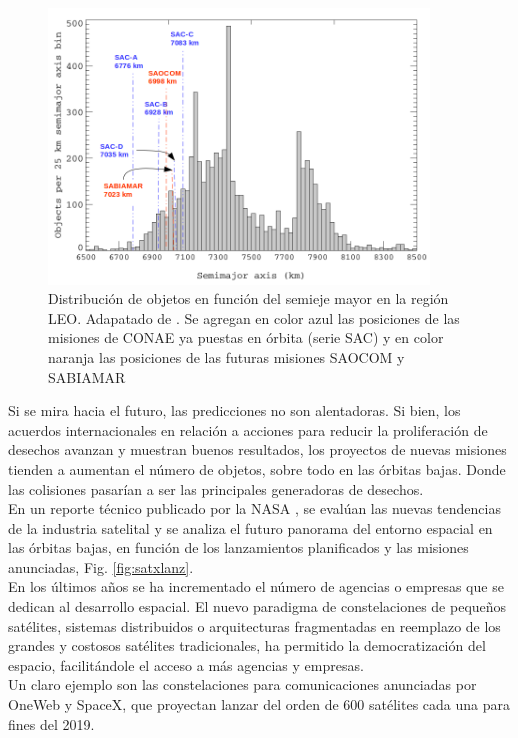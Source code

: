 \begin{figure}[!h]
  \centering
  \includegraphics[width=0.9\textwidth]{imagenes/SDvsaltura2011CONAE}
  \caption[Distribuci\'on de objetos en funci\'on del semieje mayor.]{Distribuci\'on de objetos en funci\'on del semieje mayor en la regi\'on LEO. Adapatado de \citep{Klinkrad}. Se agregan en color azul las posiciones de las misiones de CONAE ya puestas en \'orbita (serie SAC) y en color naranja las posiciones de las futuras misiones SAOCOM y SABIAMAR}
  \label{fig:Dvsaltura}
\end{figure}

Si se mira hacia el futuro, las predicciones no son alentadoras. Si bien, los acuerdos internacionales en relaci\'on a acciones para reducir la proliferaci\'on de desechos avanzan y muestran buenos resultados, los proyectos de nuevas misiones tienden a aumentan el n\'umero de objetos, sobre todo en las \'orbitas bajas. Donde las colisiones pasar\'ian a ser las principales generadoras de desechos.\\

En un reporte t\'ecnico publicado por la NASA \citep{karacalioglu2016impact}, se eval\'uan las nuevas tendencias de la industria satelital y se analiza el futuro panorama del entorno espacial en las \'orbitas bajas, en funci\'on de los lanzamientos planificados y las misiones anunciadas, Fig. \ref{fig:satxlanz}.\\

En los \'ultimos a\~nos se ha incrementado el n\'umero de agencias o empresas que se dedican al desarrollo espacial. El nuevo paradigma de constelaciones de peque\~nos sat\'elites, sistemas distribuidos o arquitecturas fragmentadas en reemplazo de los grandes y costosos sat\'elites tradicionales, ha permitido la democratizaci\'on del espacio, facilit\'andole el acceso a m\'as agencias y empresas.\\ 
Un claro ejemplo son las constelaciones para comunicaciones anunciadas por OneWeb y SpaceX, que proyectan lanzar del orden de 600 sat\'elites cada una para fines del 2019.\\

